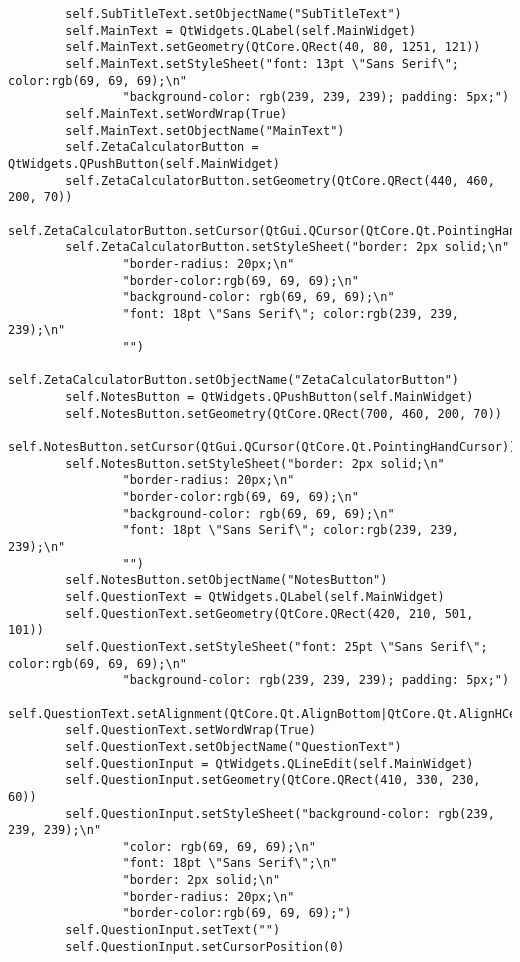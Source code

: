 \documentclass{article}
\begin{document}
\begin{lstlisting}
        self.SubTitleText.setObjectName("SubTitleText")
        self.MainText = QtWidgets.QLabel(self.MainWidget)
        self.MainText.setGeometry(QtCore.QRect(40, 80, 1251, 121))
        self.MainText.setStyleSheet("font: 13pt \"Sans Serif\"; color:rgb(69, 69, 69);\n"
                "background-color: rgb(239, 239, 239); padding: 5px;")
        self.MainText.setWordWrap(True)
        self.MainText.setObjectName("MainText")
        self.ZetaCalculatorButton = QtWidgets.QPushButton(self.MainWidget)
        self.ZetaCalculatorButton.setGeometry(QtCore.QRect(440, 460, 200, 70))
        self.ZetaCalculatorButton.setCursor(QtGui.QCursor(QtCore.Qt.PointingHandCursor))
        self.ZetaCalculatorButton.setStyleSheet("border: 2px solid;\n"
                "border-radius: 20px;\n"
                "border-color:rgb(69, 69, 69);\n"
                "background-color: rgb(69, 69, 69);\n"
                "font: 18pt \"Sans Serif\"; color:rgb(239, 239, 239);\n"
                "")
        self.ZetaCalculatorButton.setObjectName("ZetaCalculatorButton")
        self.NotesButton = QtWidgets.QPushButton(self.MainWidget)
        self.NotesButton.setGeometry(QtCore.QRect(700, 460, 200, 70))
        self.NotesButton.setCursor(QtGui.QCursor(QtCore.Qt.PointingHandCursor))
        self.NotesButton.setStyleSheet("border: 2px solid;\n"
                "border-radius: 20px;\n"
                "border-color:rgb(69, 69, 69);\n"
                "background-color: rgb(69, 69, 69);\n"
                "font: 18pt \"Sans Serif\"; color:rgb(239, 239, 239);\n"
                "")
        self.NotesButton.setObjectName("NotesButton")
        self.QuestionText = QtWidgets.QLabel(self.MainWidget)
        self.QuestionText.setGeometry(QtCore.QRect(420, 210, 501, 101))
        self.QuestionText.setStyleSheet("font: 25pt \"Sans Serif\"; color:rgb(69, 69, 69);\n"
                "background-color: rgb(239, 239, 239); padding: 5px;")
        self.QuestionText.setAlignment(QtCore.Qt.AlignBottom|QtCore.Qt.AlignHCenter)
        self.QuestionText.setWordWrap(True)
        self.QuestionText.setObjectName("QuestionText")
        self.QuestionInput = QtWidgets.QLineEdit(self.MainWidget)
        self.QuestionInput.setGeometry(QtCore.QRect(410, 330, 230, 60))
        self.QuestionInput.setStyleSheet("background-color: rgb(239, 239, 239);\n"
                "color: rgb(69, 69, 69);\n"
                "font: 18pt \"Sans Serif\";\n"
                "border: 2px solid;\n"
                "border-radius: 20px;\n"
                "border-color:rgb(69, 69, 69);")
        self.QuestionInput.setText("")
        self.QuestionInput.setCursorPosition(0)

\end{lstlisting}
\end{document}
